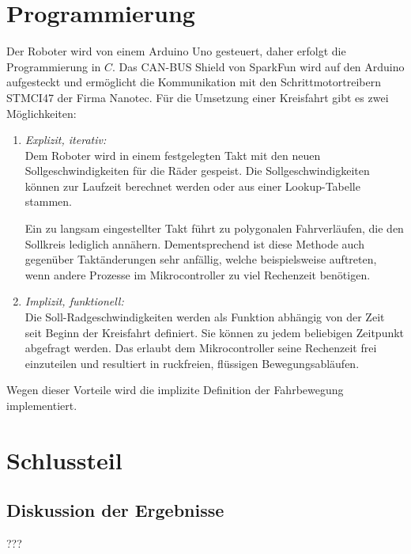 \documentclass[a4paper]{article}
\begin{document}
\section{Programmierung}
Der Roboter wird von einem Arduino Uno gesteuert, daher erfolgt die Programmierung in $C$. Das CAN-BUS Shield von SparkFun wird auf den Arduino aufgesteckt und ermöglicht die Kommunikation mit  den Schrittmotortreibern STMCI47 der Firma Nanotec.
Für die Umsetzung einer Kreisfahrt gibt es zwei Möglichkeiten:

\begin{enumerate}

\item \emph{Explizit, iterativ:} \\
Dem Roboter wird in einem festgelegten Takt mit den neuen Sollgeschwindigkeiten für die Räder gespeist. Die Sollgeschwindigkeiten können zur Laufzeit berechnet werden oder aus einer Lookup-Tabelle stammen.

Ein zu langsam eingestellter Takt führt zu polygonalen Fahrverläufen, die den Sollkreis lediglich annähern. Dementsprechend ist diese Methode auch gegenüber Taktänderungen sehr anfällig, welche beispielsweise auftreten, wenn andere Prozesse im Mikrocontroller zu viel Rechenzeit benötigen.

\item \emph{Implizit, funktionell:} \\
Die Soll-Radgeschwindigkeiten werden als Funktion abhängig von der Zeit seit Beginn der Kreisfahrt definiert. Sie können zu jedem beliebigen Zeitpunkt abgefragt werden. Das erlaubt dem Mikrocontroller seine Rechenzeit frei einzuteilen und resultiert in ruckfreien, flüssigen Bewegungsabläufen.
\end{enumerate}

Wegen dieser Vorteile wird die implizite Definition der Fahrbewegung implementiert.


\section{Schlussteil}
\subsection{Diskussion der Ergebnisse}
???
\end{document}
